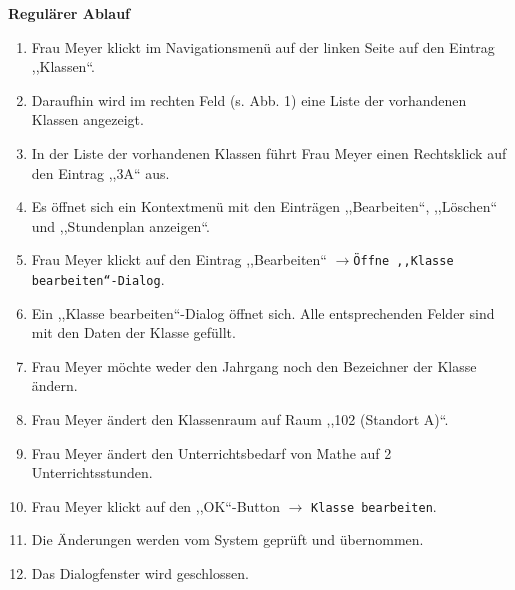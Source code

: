 \documentclass[fontsize=12pt,paper=a4,twoside]{scrartcl}
\begin{document}
\textbf{Regulärer Ablauf}
\begin{enumerate}
\item Frau Meyer klickt im Navigationsmenü auf der linken Seite auf den Eintrag ,,Klassen``.
\item Daraufhin wird im rechten Feld (s. Abb. 1) eine Liste der vorhandenen Klassen angezeigt.
\item In der Liste der vorhandenen Klassen f\"uhrt Frau Meyer einen Rechtsklick auf den Eintrag ,,3A`` aus.
\item Es \"offnet sich ein Kontextmen\"u mit den Eintr\"agen ,,Bearbeiten``, ,,L\"oschen`` und ,,Stundenplan anzeigen``.
\item Frau Meyer klickt auf den Eintrag ,,Bearbeiten`` $\rightarrow$\texttt{Öffne ,,Klasse bearbeiten``-Dialog}.
\item Ein ,,Klasse bearbeiten``-Dialog öffnet sich. Alle entsprechenden Felder sind mit den Daten der Klasse gefüllt.
\item Frau Meyer möchte weder den Jahrgang noch den Bezeichner der Klasse ändern.
\item Frau Meyer ändert den Klassenraum auf Raum ,,102 (Standort A)``.
\item Frau Meyer ändert den Unterrichtsbedarf von Mathe auf 2 Unterrichtsstunden.
\item Frau Meyer klickt auf den ,,OK``-Button $\rightarrow$ \texttt{Klasse bearbeiten}.
\item Die Änderungen werden vom System geprüft und übernommen.
\item Das Dialogfenster wird geschlossen.
\end{enumerate}
\vspace{5pt}
\end{document}
